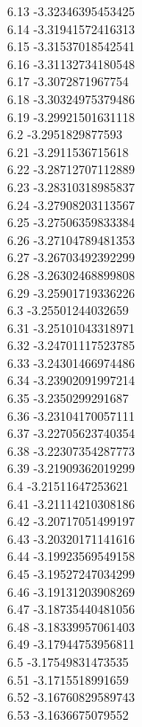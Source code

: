 {6.13	-3.32346395453425\\
6.14	-3.31941572416313\\
6.15	-3.31537018542541\\
6.16	-3.31132734180548\\
6.17	-3.3072871967754\\
6.18	-3.30324975379486\\
6.19	-3.29921501631118\\
6.2	-3.2951829877593\\
6.21	-3.2911536715618\\
6.22	-3.28712707112889\\
6.23	-3.28310318985837\\
6.24	-3.27908203113567\\
6.25	-3.27506359833384\\
6.26	-3.27104789481353\\
6.27	-3.26703492392299\\
6.28	-3.26302468899808\\
6.29	-3.25901719336226\\
6.3	-3.25501244032659\\
6.31	-3.25101043318971\\
6.32	-3.24701117523785\\
6.33	-3.24301466974486\\
6.34	-3.23902091997214\\
6.35	-3.2350299291687\\
6.36	-3.23104170057111\\
6.37	-3.22705623740354\\
6.38	-3.22307354287773\\
6.39	-3.21909362019299\\
6.4	-3.21511647253621\\
6.41	-3.21114210308186\\
6.42	-3.20717051499197\\
6.43	-3.20320171141616\\
6.44	-3.19923569549158\\
6.45	-3.19527247034299\\
6.46	-3.19131203908269\\
6.47	-3.18735440481056\\
6.48	-3.18339957061403\\
6.49	-3.17944753956811\\
6.5	-3.17549831473535\\
6.51	-3.1715518991659\\
6.52	-3.16760829589743\\
6.53	-3.1636675079552\\
}
